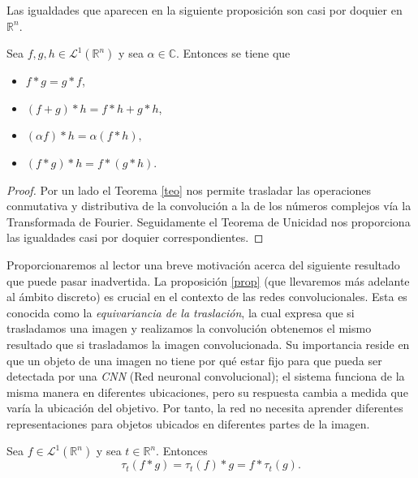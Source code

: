 \begin{observacion}
    Las igualdades que aparecen en la siguiente proposición son casi por doquier en $\mathbb{R}^n$.
\end{observacion}


\begin{proposicion}\label{prop:conv}
    Sea $f,g,h \in \mathscr{L}^1(\mathbb{R}^n)$ y sea $\alpha \in \mathbb{C}.$ Entonces se tiene que
    \begin{itemize}
        \item $f*g = g*f$,
        \item $(f+g)*h = f*h + g*h$,
        \item $(\alpha f)*h = \alpha(f*h), $
        \item $(f*g)*h = f*(g*h)$.
    \end{itemize}
\end{proposicion}

\begin{proof}
    Por un lado el Teorema \ref{teo} nos permite trasladar las operaciones conmutativa y distributiva de la convolución a la de los números complejos vía la Transformada de Fourier. Seguidamente el Teorema de Unicidad nos proporciona las igualdades casi por doquier correspondientes.
\end{proof}


\noindent Proporcionaremos al lector una breve motivación acerca del siguiente resultado que puede pasar inadvertida. La proposición \ref{prop} (que llevaremos más adelante al ámbito discreto) es crucial en el contexto de las redes convolucionales. Esta es conocida como la \textit{equivariancia de la traslación}, la cual expresa que si trasladamos una imagen y realizamos la convolución obtenemos el mismo resultado que si trasladamos la imagen convolucionada. Su importancia reside en que un objeto de una imagen no tiene por qué estar fijo para que pueda ser detectada por una \textit{CNN} (Red neuronal convolucional); el sistema funciona de la misma manera en diferentes ubicaciones, pero su respuesta cambia a medida que varía la ubicación del objetivo. Por tanto, la red no necesita aprender diferentes representaciones para objetos ubicados en diferentes partes de la imagen.

\begin{proposicion} \label{prop}Sea $f \in \mathscr{L}^1(\mathbb{R}^n)$ y sea $t \in \mathbb{R}^n.$ Entonces \begin{equation}\label{eq:prop}
    \tau_t(f*g)= \tau_t(f)*g = f*\tau_t(g).
\end{equation} 
\end{proposicion}

